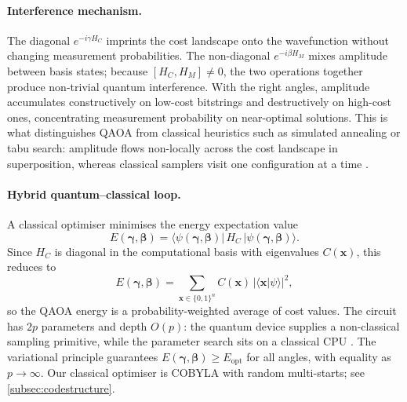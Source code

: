 \paragraph{Interference mechanism.}
The diagonal $e^{-i\gamma H_C}$ imprints the cost landscape onto the wavefunction without changing measurement probabilities. The non-diagonal $e^{-i\beta H_M}$ mixes amplitude between basis states; because $[H_C, H_M] \neq 0$, the two operations together produce non-trivial quantum interference. With the right angles, amplitude accumulates constructively on low-cost bitstrings and destructively on high-cost ones, concentrating measurement probability on near-optimal solutions. This is what distinguishes QAOA from classical heuristics such as simulated annealing or tabu search: amplitude flows non-locally across the cost landscape in superposition, whereas classical samplers visit one configuration at a time \autocite{giovagnoli_qaoa_intro}.

\paragraph{Hybrid quantum--classical loop.}
A classical optimiser minimises the energy expectation value
\begin{equation}\label{eq:Egb}
    E(\boldsymbol\gamma, \boldsymbol\beta) =
    \langle \psi(\boldsymbol\gamma,\boldsymbol\beta) |\, H_C\, | \psi(\boldsymbol\gamma,\boldsymbol\beta)\rangle.
\end{equation}
Since $H_C$ is diagonal in the computational basis with eigenvalues $C(\boldsymbol{x})$, this reduces to
\begin{equation}\label{eq:E-as-prob}
    E(\boldsymbol\gamma, \boldsymbol\beta) = \sum_{\boldsymbol{x}\in\{0,1\}^n} C(\boldsymbol{x})\, |\langle \boldsymbol{x} | \psi \rangle|^2,
\end{equation}
so the QAOA energy is a probability-weighted average of cost values. The circuit has $2p$ parameters and depth $O(p)$: the quantum device supplies a non-classical sampling primitive, while the parameter search sits on a classical CPU \autocite{tilly2022vqe}. The variational principle guarantees $E(\boldsymbol\gamma,\boldsymbol\beta) \geq E_{\text{opt}}$ for all angles, with equality as $p \to \infty$. Our classical optimiser is COBYLA with random multi-starts; see \cref{subsec:codestructure}.

